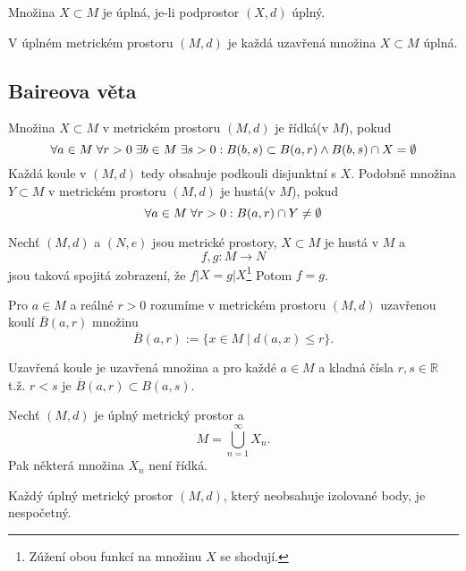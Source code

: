 \documentclass[../main.tex]{subfiles}
\begin{document}
\begin{definition}
    Množina $X \subset M$ je úplná, je-li podprostor $(X,d)$ úplný.
\end{definition}

\begin{lemma}
    V úplném metrickém prostoru $(M,d)$ je každá uzavřená množina $X \subset M$ úplná.
\end{lemma}

\subsection{Baireova věta}

\begin{definition}
    Množina $X \subset M$ v metrickém prostoru $(M,d)$ je řídká(v $M$), pokud
    \[ \forall a \in M \hspace{1mm} \forall r > 0 \hspace{1mm} \exists b \in M \hspace{1mm} \exists s > 0: B(b,s) \subset B(a,r) \land B(b,s) \cap X = \emptyset \]
    Každá koule v $(M,d)$ tedy obsahuje podkouli disjunktní s $X$.
    Podobně množina $Y \subset M$ v metrickém prostoru $(M,d)$ je hustá(v $M$), pokud
    \[ \forall a \in M \hspace{1mm} \forall r > 0: B(a,r) \cap Y \neq \emptyset \]
\end{definition}

\begin{lemma}
    Nechť $(M,d)$ a $(N,e)$ jsou metrické prostory, $X \subset M$ je hustá v $M$ a
    \[ f,g: M\to N \]
    jsou taková spojitá zobrazení, že $f|X = g|X$\footnote{Zúžení obou funkcí na množinu $X$ se shodují.} Potom $f=g$.
\end{lemma}

\begin{definition}
    Pro $a \in M$ a reálné $r > 0$ rozumíme v metrickém prostoru $(M,d)$ uzavřenou koulí $\overline{B}(a,r)$ množinu
    \[ \overline{B}(a,r) := \{ x \in M \mid d(a,x) \leq r \}.\]
\end{definition}

\noindent
Uzavřená koule je uzavřená množina a pro každé $a\in M$ a kladná čísla $r,s \in \mathbb{R}$ t.ž. $r<s$ je $\overline{B}(a,r) \subset B(a,s)$.

\begin{theorem}[Baireova]
    Nechť $(M,d)$ je úplný metrický prostor a \[ M = \bigcup_{n=1}^{\infty} X_n. \]
    Pak některá množina $X_n$ není řídká.
\end{theorem}

\begin{consequence}
    Každý úplný metrický prostor $(M,d)$, který neobsahuje izolované body, je nespočetný.
\end{consequence}
\end{document}
